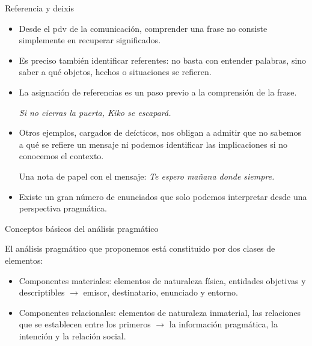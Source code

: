 \documentclass{beamer}
\begin{document}
\begin{frame}{Referencia y deixis}

\begin{itemize}
	\item Desde el pdv de la comunicación, comprender una frase no consiste simplemente en recuperar significados.
	\item Es preciso también identificar referentes: no basta con entender palabras, sino saber a qué objetos, hechos o situaciones se refieren.
	\item La asignación de referencias es un paso previo a la comprensión de la frase.

	\it{Si no cierras la puerta, Kiko se escapará.}
	
	\item Otros ejemplos, cargados de deícticos, nos obligan a admitir que no sabemos a qué se refiere un mensaje ni podemos identificar las implicaciones si no conocemos el contexto.

	Una nota de papel con el mensaje: \it{Te espero mañana donde siempre.} 
	
	\item Existe un gran número de enunciados que solo podemos interpretar desde una perspectiva pragmática. 
\end{itemize}
\end{frame}


\begin{frame}{Conceptos básicos del análisis pragmático}

El análisis pragmático que proponemos está constituido por dos clases de elementos:

\begin{itemize}
	\item Componentes materiales: elementos de naturaleza física, entidades objetivas y descriptibles $\rightarrow$ emisor, destinatario, enunciado y entorno.
	\item Componentes relacionales: elementos de naturaleza inmaterial, las relaciones que se establecen entre los primeros $\rightarrow$ la información pragmática, la intención y la relación social. 
\end{itemize}

\end{frame}
\end{document}
